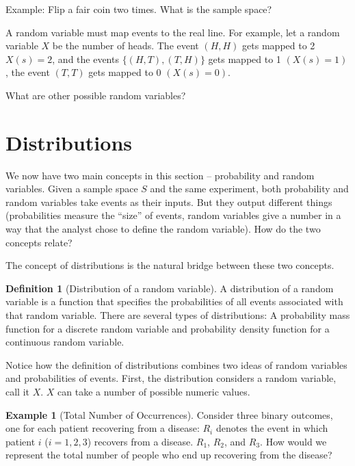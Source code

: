 \documentclass[
]{book}
\theoremstyle{definition}
\newtheorem{definition}{Definition}[chapter]
\theoremstyle{definition}
\newtheorem{example}{Example}[chapter]
\theoremstyle{definition}
\theoremstyle{remark}
\begin{document}
Example: Flip a fair coin two times. What is the sample space?

A random variable must map events to the real line. For example, let a random variable \(X\) be the number of heads. The event \((H, H)\) gets mapped to 2 \(X(s) = 2\), and the events \(\{(H, T), (T, H)\}\) gets mapped to 1 \((X(s) = 1)\), the event \((T, T)\) gets mapped to 0 \((X(s) = 0)\).

What are other possible random variables?

\hypertarget{distributions}{%
\section{Distributions}\label{distributions}}

We now have two main concepts in this section -- probability and random variables. Given a sample space \(S\) and the same experiment, both probability and random variables take events as their inputs. But they output different things (probabilities measure the ``size'' of events, random variables give a number in a way that the analyst chose to define the random variable). How do the two concepts relate?

The concept of distributions is the natural bridge between these two concepts.

\begin{definition}[Distribution of a random variable]
\protect\hypertarget{def:unnamed-chunk-72}{}{\label{def:unnamed-chunk-72} {} }A distribution of a random variable is a function that specifies the probabilities of all events associated with that random variable. There are several types of distributions: A probability mass function for a discrete random variable and probability density function for a continuous random variable.
\end{definition}

Notice how the definition of distributions combines two ideas of random variables and probabilities of events. First, the distribution considers a random variable, call it \(X\). \(X\) can take a number of possible numeric values.

\begin{example}[Total Number of Occurrences]
\protect\hypertarget{exm:unnamed-chunk-73}{}{\label{exm:unnamed-chunk-73} {} }
Consider three binary outcomes, one for each patient recovering from a disease: \(R_i\) denotes the event in which patient \(i\) (\(i = 1, 2, 3\)) recovers from a disease. \(R_1\), \(R_2\), and \(R_3\). How would we represent the total number of people who end up recovering from the disease?
\end{example}
\end{document}
